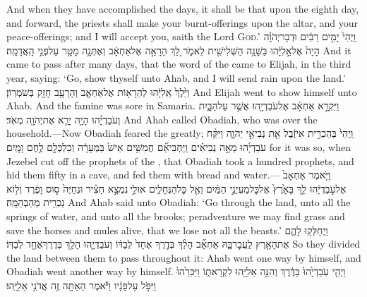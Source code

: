 {And when they have accomplished the days, it shall be that upon the eighth day, and forward, the priests shall make your burnt-offerings upon the altar, and your peace-offerings; and I will accept you, saith the Lord \textsc{God}.’}
\label{haft_21}
\setcounter{chap}{18}
\setcounter{verse}{1}
{וַֽיְהִי֙ יָמִ֣ים רַבִּ֔ים וּדְבַר\maqqaf יְהֹוָ֗ה הָיָה֙ אֶל\maqqaf אֵ֣לִיָּ֔הוּ בַּשָּׁנָ֥ה הַשְּׁלִישִׁ֖ית לֵאמֹ֑ר לֵ֚ךְ הֵרָאֵ֣ה אֶל\maqqaf אַחְאָ֔ב וְאֶתְּנָ֥ה מָטָ֖ר עַל\maqqaf פְּנֵ֥י הָֽאֲדָמָֽה׃}
{And it came to pass after many days, that the word of the \lord\space came to Elijah, in the third year, saying: ‘Go, show thyself unto Ahab, and I will send rain upon the land.’}
{וַיֵּ֙לֶךְ֙ אֵֽלִיָּ֔הוּ לְהֵרָא֖וֹת אֶל\maqqaf אַחְאָ֑ב וְהָרָעָ֥ב חָזָ֖ק בְּשֹׁמְרֽוֹן׃}
{And Elijah went to show himself unto Ahab. And the famine was sore in Samaria.}
{וַיִּקְרָ֣א אַחְאָ֔ב אֶל\maqqaf עֹבַדְיָ֖הוּ אֲשֶׁ֣ר עַל\maqqaf הַבָּ֑יִת וְעֹבַדְיָ֗הוּ הָיָ֥ה יָרֵ֛א אֶת\maqqaf יְהֹוָ֖ה מְאֹֽד׃}
{And Ahab called Obadiah, who was over the household.—Now Obadiah feared the \lord\space greatly;}
{וַֽיְהִי֙ בְּהַכְרִ֣ית אִיזֶ֔בֶל אֵ֖ת נְבִיאֵ֣י יְהֹוָ֑ה וַיִּקַּ֨ח עֹבַדְיָ֜הוּ מֵאָ֣ה נְבִיאִ֗ים וַֽיַּחְבִּיאֵ֞ם חֲמִשִּׁ֥ים אִישׁ֙ בַּמְּעָרָ֔ה וְכִלְכְּלָ֖ם לֶ֥חֶם וָמָֽיִם׃}
{for it was so, when Jezebel cut off the prophets of the \lord, that Obadiah took a hundred prophets, and hid them fifty in a cave, and fed them with bread and water.—}
{וַיֹּ֤אמֶר אַחְאָב֙ אֶל\maqqaf עֹ֣בַדְיָ֔הוּ לֵ֤ךְ בָּאָ֙רֶץ֙ אֶל\maqqaf כׇּל\maqqaf מַעְיְנֵ֣י הַמַּ֔יִם וְאֶ֖ל כׇּל\maqqaf הַנְּחָלִ֑ים אוּלַ֣י \legarmeh  נִמְצָ֣א חָצִ֗יר וּנְחַיֶּה֙ ס֣וּס וָפֶ֔רֶד וְל֥וֹא נַכְרִ֖ית מֵהַבְּהֵמָֽה׃}
{And Ahab said unto Obadiah: ‘Go through the land, unto all the springs of water, and unto all the brooks; peradventure we may find grass and save the horses and mules alive, that we lose not all the beasts.’}
{וַֽיְחַלְּק֥וּ לָהֶ֛ם אֶת\maqqaf הָאָ֖רֶץ לַֽעֲבׇר\maqqaf בָּ֑הּ אַחְאָ֞ב הָלַ֨ךְ בְּדֶ֤רֶךְ אֶחָד֙ לְבַדּ֔וֹ וְעֹבַדְיָ֛הוּ הָלַ֥ךְ בְּדֶרֶךְ\maqqaf אֶחָ֖ד לְבַדּֽוֹ׃}
{So they divided the land between them to pass throughout it: Ahab went one way by himself, and Obadiah went another way by himself.}
{וַיְהִ֤י עֹֽבַדְיָ֙הוּ֙ בַּדֶּ֔רֶךְ וְהִנֵּ֥ה אֵלִיָּ֖הוּ לִקְרָאת֑וֹ וַיַּכִּרֵ֙הוּ֙ וַיִּפֹּ֣ל עַל\maqqaf פָּנָ֔יו וַיֹּ֕אמֶר הַאַתָּ֥ה זֶ֖ה אֲדֹנִ֥י אֵלִיָּֽהוּ׃}
